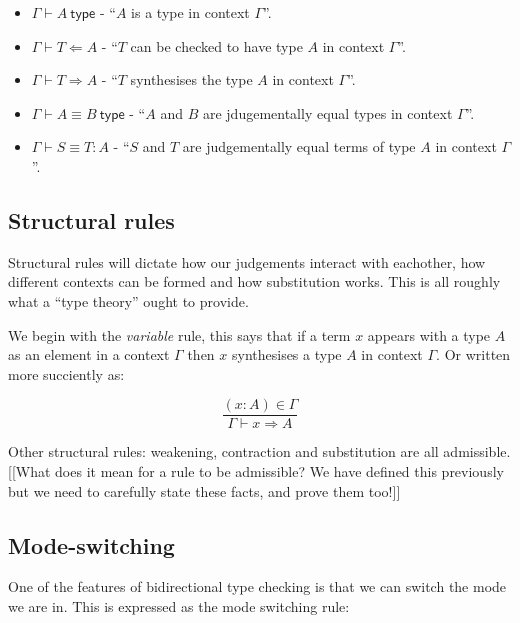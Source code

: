 \begin{itemize}
    \item $\Gamma \vdash A\ \mathsf{type}$ - ``$A$ is a type in context $\Gamma$''.
    \item $\Gamma \vdash T \Leftarrow A$ - ``$T$ can be checked to have type $A$ in context $\Gamma$''.
    \item $\Gamma \vdash T \Rightarrow A$ - ``$T$ synthesises the type $A$ in context $\Gamma$''.
    \item $\Gamma \vdash A \equiv B\ \mathsf{type}$ - ``$A$ and $B$ are jdugementally equal types in context $\Gamma$''.
    \item $\Gamma \vdash S \equiv T : A$ - ``$S$ and $T$ are judgementally equal terms of type $A$ in context $\Gamma$''.
\end{itemize}

\subsection{Structural rules}

Structural rules will dictate how our judgements interact with eachother, how different contexts can be formed and how substitution works. This is all roughly what a ``type theory'' ought to provide.

We begin with the \emph{variable} rule, this says that if a term $x$ appears with a type $A$ as an element in a context $\Gamma$ then $x$ synthesises a type $A$ in context $\Gamma$. Or written more succiently as:

$$
    \frac{(x:A) \in \Gamma }{\Gamma \vdash x \Rightarrow A}
$$

Other structural rules: weakening, contraction and substitution are all admissible. [[What does it mean for a rule to be admissible? We have defined this previously but we need to carefully state these facts, and prove them too!]]

\subsection{Mode-switching}

One of the features of bidirectional type checking is that we can switch the mode we are in. This is expressed as the mode switching rule:

\begin{prooftree}
\end{prooftree}

